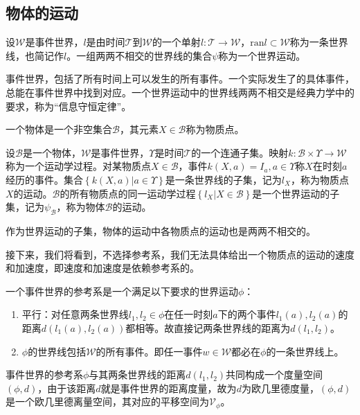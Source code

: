 \documentclass[main.tex]{subfiles}
\begin{document}
\subsection{物体的运动}
\begin{definition}[世界线与世界运动]
设$\mathcal{W}$是事件世界，$l$是由时间$\mathcal{T}$到$\mathcal{W}$的一个单射$l:\mathcal{T}\rightarrow\mathcal{W}$，$\mathrm{ran}l\subset\mathcal{W}$称为一条世界线，也简记作$l$。一组两两不相交的世界线的集合$\psi$称为一个世界运动。
\end{definition}

事件世界，包括了所有时间上可以发生的所有事件。一个实际发生了的具体事件，总能在事件世界中找到对应。一个世界运动中的世界线两两不相交是经典力学中的要求，称为“信息守恒定律”。

\begin{definition}[物体]
一个物体是一个非空集合$\mathcal{B}$，其元素$X\in\mathcal{B}$称为物质点。
\end{definition}

\begin{definition}
设$\mathcal{B}$是一个物体，$\mathcal{W}$是事件世界，$\Upsilon$是时间$\mathcal{T}$的一个连通子集。映射$k:\mathcal{B}\times\Upsilon\rightarrow\mathcal{W}$称为一个运动学过程。对某物质点$X\in\mathcal{B}$，事件$k\left(X,a\right)=I_a,a\in\Upsilon$称$X$在时刻$a$经历的事件。集合$\left\{k\left(X,a\right)|a\in\Upsilon\right\}$是一条世界线的子集，记为$l_X$，称为物质点$X$的运动。$\mathcal{B}$的所有物质点的同一运动学过程$\left\{l_X|X\in\mathcal{B}\right\}$是一个世界运动的子集，记为$\psi_\mathcal{B}$，称为物体$\mathcal{B}$的运动。
\end{definition}

作为世界运动的子集，物体的运动中各物质点的运动也是两两不相交的。

接下来，我们将看到，不选择参考系，我们无法具体给出一个物质点的运动的速度和加速度，即速度和加速度是依赖参考系的。

\begin{definition}[事件世界的参考系]
一个事件世界的参考系是一个满足以下要求的世界运动$\phi$：
\begin{enumerate}
    \item 平行：对任意两条世界线$l_1,l_2\in\phi$在任一时刻$a$下的两个事件$l_1\left(a\right),l_2\left(a\right)$的距离$d\left(l_1\left(a\right),l_2\left(a\right)\right)$都相等。故直接记两条世界线的距离为$d\left(l_1,l_2\right)$。
    \item $\phi$的世界线包括$\mathcal{W}$的所有事件。即任一事件$w\in\mathcal{W}$都必在$\phi$的一条世界线上。
\end{enumerate}
事件世界的参考系$\phi$与其两条世界线的距离$d\left(l_1,l_2\right)$共同构成一个度量空间$\left(\phi,d\right)$，由于该距离$d$就是事件世界的距离度量，故为$d$为欧几里德度量，$\left(\phi,d\right)$是一个欧几里德离量空间，其对应的平移空间为$\mathcal{V}_\phi$。
\end{definition}
\end{document}
